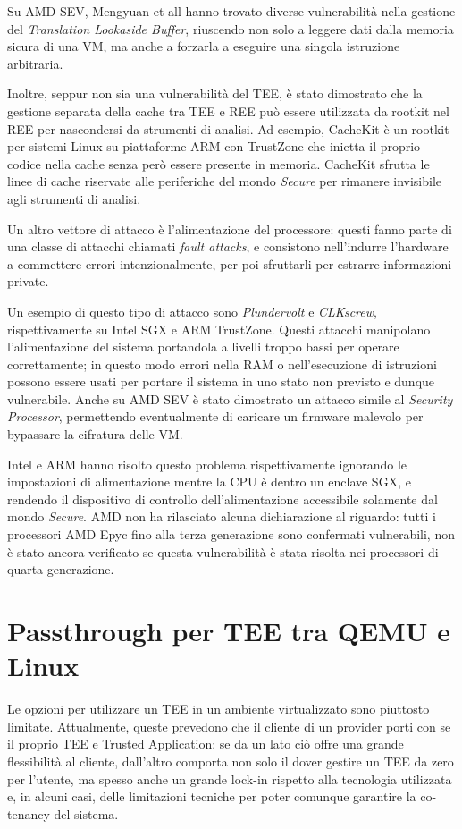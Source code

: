 \documentclass[12pt,italian]{report}
\begin{document}
Su AMD SEV, Mengyuan et all\cite{sev_tlb_poisoning} hanno trovato diverse
vulnerabilità nella gestione del \textit{Translation Lookaside Buffer},
riuscendo non solo a leggere dati dalla memoria sicura di una VM, ma anche
a forzarla a eseguire una singola istruzione arbitraria.

Inoltre, seppur non sia una vulnerabilità del TEE, è stato
dimostrato che la gestione separata della cache tra TEE e REE
può essere utilizzata da rootkit nel REE per nascondersi da strumenti
di analisi.
Ad esempio, CacheKit\cite{cachekit} è un rootkit per sistemi Linux
su piattaforme ARM con TrustZone che inietta il proprio codice nella
cache senza però essere presente in memoria.
CacheKit sfrutta le linee di cache riservate alle periferiche
del mondo \textit{Secure} per rimanere invisibile agli strumenti
di analisi. 

\bigbreak
Un altro vettore di attacco è l'alimentazione del processore: questi
fanno parte di una classe di attacchi chiamati \textit{fault attacks},
e consistono nell'indurre l'hardware a commettere errori intenzionalmente,
per poi sfruttarli per estrarre informazioni private.

Un esempio di questo tipo di attacco sono
\textit{Plundervolt}\cite{plundervolt} e
\textit{CLKscrew}\cite{clkscrew},
rispettivamente su Intel SGX e ARM TrustZone.
Questi attacchi manipolano l'alimentazione del sistema portandola a livelli
troppo bassi per operare correttamente; in questo modo errori nella RAM
o nell'esecuzione di istruzioni possono essere usati per portare il sistema
in uno stato non previsto e dunque vulnerabile.
Anche su AMD SEV è stato dimostrato un attacco simile\cite{sev_power_attack}
al \textit{Security Processor}, permettendo eventualmente di caricare un
firmware malevolo per bypassare la cifratura delle VM.

Intel e ARM hanno risolto questo problema rispettivamente ignorando le
impostazioni di alimentazione mentre la CPU è dentro un enclave SGX, e
rendendo il dispositivo di controllo dell'alimentazione accessibile
solamente dal mondo \textit{Secure}.
AMD non ha rilasciato alcuna dichiarazione al riguardo: tutti i processori
AMD Epyc fino alla terza generazione sono confermati vulnerabili, non è
stato ancora verificato se questa vulnerabilità è stata risolta nei
processori di quarta generazione.

\chapter{Passthrough per TEE tra QEMU e Linux}
\label{chap:passthrough-tee-qemu-linux}
Le opzioni per utilizzare un TEE in un ambiente virtualizzato
sono piuttosto limitate.
Attualmente, queste prevedono che il cliente di un
provider porti con se il proprio TEE e Trusted Application:
se da un lato ciò offre una grande flessibilità al cliente, dall'altro
comporta non solo il dover gestire un TEE da zero per l'utente, ma spesso
anche un grande lock-in rispetto alla tecnologia utilizzata e, in alcuni
casi, delle limitazioni tecniche per poter comunque garantire la
co-tenancy del sistema.
\end{document}
